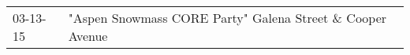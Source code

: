 \begin{supertabular}{p{0.07\textwidth}p{0.23\textwidth}}
 03-13-15 &  "Aspen Snowmass CORE Party" Galena Street \& Cooper Avenue \\
\end{supertabular}
